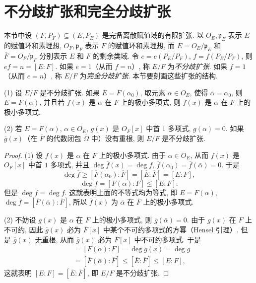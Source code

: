 \section{不分歧扩张和完全分歧扩张}\label{sec:ch8-s4}

本节中设 $(F,P_F)\subseteq(E,P_E)$ 是完备离散赋值域的有限扩张. 以 $O_E,\mathfrak{p}_E$ 表示 $E$ 的赋值环和素理想, $O_F,\mathfrak{p}_F$ 表示 $F$ 的赋值环和素理想, 而 $\overline{E}=O_E/\mathfrak{p}_E$ 和 $\overline{F}=O_F/\mathfrak{p}_F$ 分别表示 $E$ 和 $F$ 的剩余类域. 令 $e=e(P_E/P_F)$, $f=f(P_E/P_F)$, 则 $ef=n=[E:F]$. 如果 $e=1$（从而 $f=n$）, 称 $E/F$ 为\emph{不分歧扩张}. 如果 $f=1$（从而 $e=n$）, 称 $E/F$ 为\emph{完全分歧扩张}. 本节要刻画这些扩张的结构.

\begin{theorem}\label{thm:8.17}
(1) 设 $E/F$ 是不分歧扩张. 如果 $\overline{E}=\overline{F}(\alpha_0)$, 取元素 $\alpha\in O_E$, 使得 $\bar{\alpha}=\alpha_0$, 则 $E=F(\alpha)$, 并且若 $f(x)$ 是 $\alpha$ 在 $F$ 上的极小多项式, 则 $\overline{f}(x)$ 是 $\bar{\alpha}$ 在 $\overline{F}$ 上的极小多项式.

(2) 若 $E=F(\alpha)$, $\alpha\in O_E$, $g(x)$ 是 $O_F[x]$ 中首 $1$ 多项式, $g(\alpha)=0$. 如果 $\overline{g}(x)$（在 $\overline{F}$ 的代数闭包 $\overline{\Omega}$ 中）没有重根, 则 $E/F$ 是不分歧扩张.
\end{theorem}

\begin{proof}
(1) 设 $f(x)$ 是 $\alpha$ 在 $F$ 上的极小多项式. 由于 $\alpha\in O_E$, 从而 $f(x)$ 是 $O_F[x]$ 中首 $1$ 多项式, 并且 $\deg\overline{f}(x)=\deg f$, $\overline{f}(\alpha_0)=\overline{f}(\bar{\alpha})=0$. 于是
\[
  \deg\overline{f}\geqslant[\overline{F}(\alpha_0):\overline{F}]=[\overline{E}:\overline{F}]=[E:F],
\]
\[
  \deg f=[F(\alpha):F]\leqslant[E:F].
\]
但是 $\deg\overline{f}=\deg f$. 这就表明上面的不等式均为等式, 即 $E=F(\alpha)$, $\deg\overline{f}=[\overline{F}(\bar{\alpha}):\overline{F}]$, 所以 $\overline{f}(x)$ 为 $\bar{\alpha}$ 在 $\overline{F}$ 上的极小多项式.

(2) 不妨设 $g(x)$ 是 $\alpha$ 在 $F$ 上的极小多项式, 则 $\overline{g}(\bar{\alpha})=0$. 由于 $g(x)$ 在 $F$ 上不可约, 因此 $\overline{g}(x)$ 必为 $\overline{F}[x]$ 中某个不可约多项式的方幂（Hensel 引理）. 但是 $\overline{g}(x)$ 无重根, 从而 $\overline{g}(x)$ 必为 $\overline{F}[x]$ 中不可约多项式. 于是
\begin{align*}
  [E:F]&=[F(\alpha):F]=\deg g(x)=\deg\overline{g}\\
  &=[\overline{F}(\bar{\alpha}):\overline{F}]\leqslant[\overline{E}:\overline{F}]\leqslant[E:F],
\end{align*}
这就表明 $[E:F]=[\overline{E}:\overline{F}]$, 即 $E/F$ 是不分歧扩张.
\end{proof}

